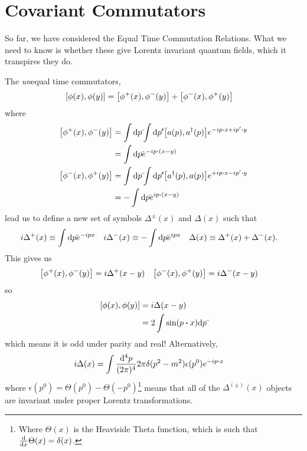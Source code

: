 \documentclass[notes.tex]{subfiles}
\begin{document}
\section{Covariant Commutators}
So far, we have considered the Equal Time Commutation Relations. What we need to know is whether these give Lorentz invariant quantum fields, which it transpires they do.

The \emph{un}equal time commutators,
\begin{align*}
    \commutator{\phi(x)}{\phi(y)} &= \commutator{\phi^+(x)}{\phi^-(y)} + \commutator{\phi^-(x)}{\phi^+(y)}
\end{align*}
where
\begin{align*}
    \commutator{\phi^+(x)}{\phi^-(y)} &= \int \dds{p} \int \dds{p^\prime} \commutator{a(p)}{a^\dagger(p)}e^{-ip\vdot x + i p^\prime \vdot y}\\
    &= \int\dds{p}e^{-ip\vdot(x - y)}\\
    \commutator{\phi^-(x)}{\phi^+(y)} &= \int \dds{p} \int \dds{p^\prime} \commutator{a^\dagger(p)}{a(p)}e^{+ip\vdot x - i p^\prime \vdot y}\\
    &= -\int\dds{p}e^{ip\vdot(x - y)}
\end{align*}
lead us to define a new set of symbols $\Delta^\pm(x)$ and $\Delta(x)$ such that
\begin{align}
    i\Delta^+(x)&\equiv\int\dds{p}e^{-ipx} & i\Delta^-(x)&\equiv -\int\dds{p}e^{ipx} & \Delta(x) &\equiv \Delta^+(x) + \Delta^-(x).\label{eqn:rqft_canonical-quantisation_feynprops}
\end{align}
This gives us
\begin{align*}
    \commutator{\phi^+(x)}{\phi^-(y)} &= i\Delta^+(x-y) & \commutator{\phi^-(x)}{\phi^+(y)} &= i\Delta^-(x-y)
\end{align*}
so 
\begin{align*}
    \commutator{\phi(x)}{\phi(y)} &= i\Delta(x-y)\\
    &= 2\int\sin(p\vdot{x})\dds{p}
\end{align*}
which means it is odd under parity and real! 
Alternatively, 
\begin{align*}
    i\Delta(x) &= \int \frac{\dd[4]{p}}{(2\pi)^4} 2\pi\delta(p^2 - m^2)\epsilon(p^0) e^{-ip\vdot x}
\end{align*}
where $\epsilon(p^0) = \Theta(p^0) - \Theta(-p^0)$\footnote{Where $\Theta(x)$ is the Heaviside Theta function, which is such that $\dv{x}\Theta(x) = \delta(x)$.} means that all of the $\Delta^{(\pm)}(x)$ objects are invariant under proper Lorentz transformations.
\end{document}
